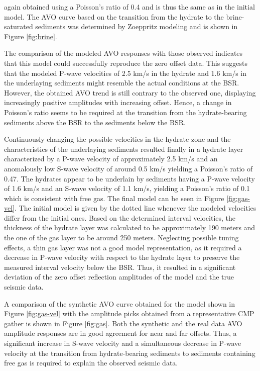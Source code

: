 again obtained using a Poisson's ratio of 0.4 and is thus the same as in the 
initial model.
The AVO curve based on the transition from the hydrate to the brine-saturated
sediments was determined by Zoeppritz modeling and is shown in
Figure \ref{fig:brine}.
\par
The comparison of the modeled AVO responses with those observed 
indicates that this
model could successfully reproduce the zero offset data. This suggests that the
modeled P-wave velocities of 2.5 km/s in the hydrate and 1.6 km/s in
the underlaying sediments might resemble the actual conditions at the BSR.
However, the obtained AVO trend is still contrary to the observed one,
displaying increasingly positive amplitudes with increasing offset. Hence,
a change in Poisson's ratio seems to be required at the transition from the
hydrate-bearing sediments above the BSR to the sediments below the BSR.
\par
Continuously changing the possible velocities in the hydrate zone and the 
characteristics of the underlaying sediments resulted finally in a hydrate layer
characterized by a P-wave velocity of approximately 2.5 km/s and an anomalously
low S-wave velocity of around 0.5 km/s yielding a Poisson's ratio of 0.47.
The hydrates appear to be underlain by sediments having a 
P-wave velocity of 1.6 km/s and an S-wave velocity of 1.1 km/s, yielding a
Poisson's ratio of 0.1 which is consistent with free gas. The final model can 
be seen in Figure \ref{fig:gas-vel}. The initial model is given by the dotted line
whenever the modeled velocities differ from the initial ones.
Based on the determined interval velocities,
the thickness of the hydrate layer was calculated to be approximately 190
meters and the one of the gas layer to be around 250 meters. Neglecting possible
tuning effects, a thin gas layer was not a good model representation,
as it required a decrease in P-wave velocity with respect to the hydrate
layer to preserve the measured interval velocity below the BSR. Thus, it
resulted in a significant 
deviation of the zero offset reflection amplitudes of the model
and the true seismic data.
\par
A comparison of the synthetic AVO curve obtained for the model shown in
Figure \ref{fig:gas-vel} with the amplitude picks obtained
from a representative CMP gather is shown in Figure \ref{fig:gas}. Both the
synthetic and the real data AVO amplitude responses are in good agreement
for near and far offsets. Thus, a significant increase in S-wave velocity and
a simultaneous decrease in P-wave velocity at the transition from 
hydrate-bearing sediments to sediments containing free gas is required to
explain the observed seismic data. 

